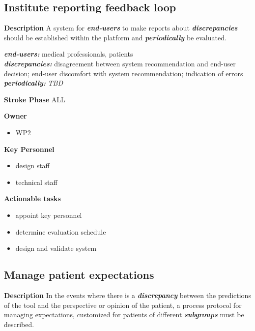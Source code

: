 \documentclass[
  letterpaper,
  DIV=11,
  numbers=noendperiod]{scrreport}
\providecommand{\tightlist}{%
  \setlength{\itemsep}{0pt}\setlength{\parskip}{0pt}}\usepackage{longtable,booktabs,array}
\begin{document}
\hypertarget{institute-reporting-feedback-loop}{%
\subsection{Institute reporting feedback
loop}\label{institute-reporting-feedback-loop}}

\textbf{Description} A system for \textbf{\emph{end-users}} to make
reports about \textbf{\emph{discrepancies}} should be established within
the platform and \textbf{\emph{periodically}} be evaluated.

\textbf{\emph{end-users:}} medical professionals, patients\\
\textbf{\emph{discrepancies:}} disagreement between system
recommendation and end-user decision; end-user discomfort with system
recommendation; indication of errors\\
\textbf{\emph{periodically:}} \emph{TBD}

\textbf{Stroke Phase} ALL

\textbf{Owner}

\begin{itemize}
\tightlist
\item
  WP2
\end{itemize}

\textbf{Key Personnel}

\begin{itemize}
\tightlist
\item
  design staff
\item
  technical staff
\end{itemize}

\textbf{Actionable tasks}

\begin{itemize}
\tightlist
\item
  appoint key personnel
\item
  determine evaluation schedule
\item
  design and validate system
\end{itemize}

\hypertarget{manage-patient-expectations}{%
\subsection{Manage patient
expectations}\label{manage-patient-expectations}}

\textbf{Description} In the events where there is a
\textbf{\emph{discrepancy}} between the predictions of the tool and the
perspective or opinion of the patient, a process protocol for managing
expectations, customized for patients of different
\textbf{\emph{subgroups}} must be described.
\end{document}
